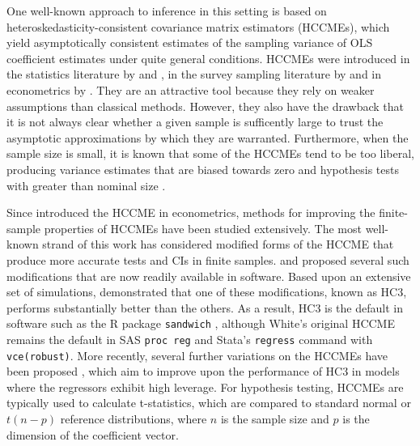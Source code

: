 \documentclass[12pt]{article}\usepackage[]{graphicx}\usepackage[]{color}
\begin{document}
One well-known approach to inference in this setting is based on heteroskedasticity-consistent covariance matrix estimators (HCCMEs), which yield asymptotically consistent estimates of the sampling variance of OLS coefficient estimates under quite general conditions. HCCMEs were introduced in the statistics literature by \citet{Huber1967behavior} and \citet{Eicker1967limit}, in the survey sampling literature by and in econometrics by \citet{White1980heteroskedasticity}. They are an attractive tool because they rely on weaker assumptions than classical methods. However, they also have the drawback that it is not always clear whether a given sample is sufficently large to trust the asymptotic approximations by which they are warranted. Furthermore, when the sample size is small, it is known that some of the HCCMEs tend to be too liberal, producing variance estimates that are biased towards zero and hypothesis tests with greater than nominal size \citep{Long2000using}. 

Since \citet{White1980heteroskedasticity} introduced the HCCME in econometrics, methods for improving the finite-sample properties of HCCMEs have been studied extensively.  
The most well-known strand of this work has considered modified forms of the HCCME that produce more accurate tests and CIs in finite samples. \citet{MacKinnon1985some} and \citet{Davidson1993estimation} proposed several such modifications that are now readily available in software. 
Based upon an extensive set of simulations, \citet{Long2000using} demonstrated that one of these modifications, known as HC3, performs substantially better than the others.
As a result, HC3 is the default in software such as the R package \texttt{sandwich} \citep{Zeileis2004econometric}, although White's original HCCME remains the default in SAS \texttt{proc reg} and Stata's \texttt{regress} command with \texttt{vce(robust)}. 
More recently, several further variations on the HCCMEs have been proposed \citep{Cribari-Neto2004asymptotic, Cribari-Neto2007inference, Cribari-Neto2011new}, which aim to improve upon the performance of HC3 in models where the regressors exhibit high leverage. 
For hypothesis testing, HCCMEs are typically used to calculate t-statistics, which are compared to standard normal or $t(n - p)$ reference distributions, where $n$ is the sample size and $p$ is the dimension of the coefficient vector.
\end{document}
